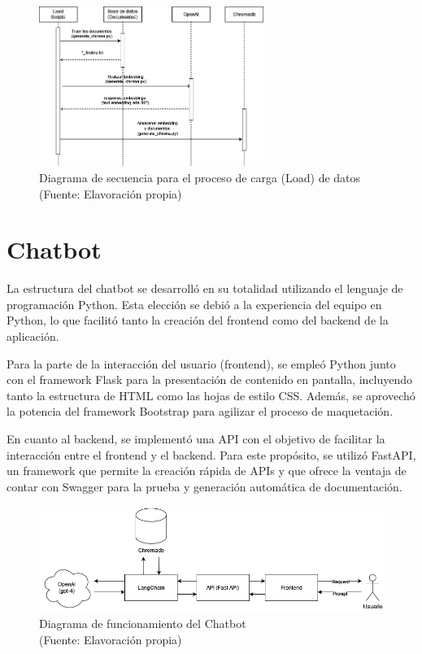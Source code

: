 \begin{figure}[ht!]
    \centering
    \includegraphics[width=0.65\textwidth]{figures/load_diagram.png}
    \caption[Diagrama de secuencia para el proceso de carga (Load) de datos]{Diagrama de secuencia para el proceso de carga (Load)  de datos\\
    {\scriptsize (Fuente: Elavoración propia)}}
    \label{fig:chatbot1}
\end{figure}

\newpage
\section{Chatbot}

   
La estructura del chatbot se desarrolló en su totalidad utilizando el lenguaje de programación Python. Esta elección se debió a la 
experiencia del equipo en Python, lo que facilitó tanto la creación del frontend como del backend de la aplicación.

Para la parte de la interacción del usuario (frontend), se empleó Python junto con el framework Flask para la presentación 
de contenido en pantalla, incluyendo tanto la estructura de HTML como las hojas de estilo CSS. Además, se aprovechó la potencia del 
framework Bootstrap para agilizar el proceso de maquetación.

En cuanto al backend, se implementó una API con el objetivo de facilitar la interacción entre el frontend y el backend. Para este 
propósito, se utilizó FastAPI, un framework que permite la creación rápida de APIs y que ofrece la ventaja de contar con Swagger 
para la prueba y generación automática de documentación.

\begin{figure}[ht!]
    \centering
    \includegraphics[width=.8\textwidth]{figures/finalhuemul.png}
    \caption[Diagrama de funcionamiento del Chatbot]{Diagrama de funcionamiento del Chatbot\\
    {\scriptsize (Fuente: Elavoración propia)}}
    \label{fig:chatbot1}
\end{figure}

